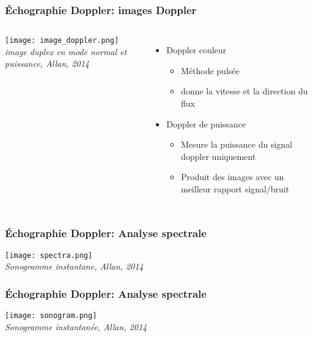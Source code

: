 \documentclass{beamer}
\begin{document}
\begin{frame}
\frametitle{\'Echographie Doppler: images Doppler}
\begin{columns}
\column{60mm}
\begin{center}
\texttt{[image: image\_doppler.png]}\\
\textit{\footnotesize image duplex en mode normal et puissance, Allan, 2014}
\end{center}
\column{60mm}
\begin{itemize}
\item Doppler couleur
\vspace{0.2cm}
\begin{itemize}
\item Méthode pulsée
\vspace{0.2cm}
\item donne la vitesse et la direction du flux
\vspace{0.2cm} 
\end{itemize}
\item Doppler de puissance
\vspace{0.2cm}
\begin{itemize}
\item Mesure la puissance du signal doppler uniquement
\vspace{0.2cm}
\item Produit des images avec un meilleur rapport signal/bruit 
\end{itemize}
\end{itemize}
\end{columns}
\end{frame}

\begin{frame}
\frametitle{\'Echographie Doppler: Analyse spectrale}
\begin{center}
\texttt{[image: spectra.png]}\\
\textit{\footnotesize Sonogramme instantane, Allan, 2014}
\end{center}
\end{frame}

\begin{frame}
\frametitle{\'Echographie Doppler: Analyse spectrale}
\begin{center}
\texttt{[image: sonogram.png]}\\
\textit{\footnotesize Sonogramme instantanée, Allan, 2014}
\end{center}
\end{frame}
\end{document}
